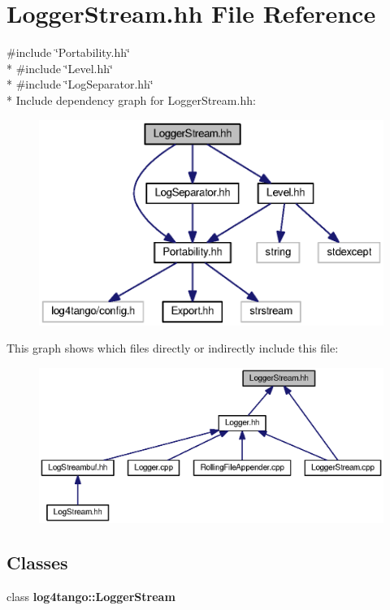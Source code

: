 \section{Logger\-Stream.\-hh File Reference}
\label{LoggerStream_8hh}
{\ttfamily \#include \char`\"{}Portability.\-hh\char`\"{}}\\*
{\ttfamily \#include \char`\"{}Level.\-hh\char`\"{}}\\*
{\ttfamily \#include \char`\"{}Log\-Separator.\-hh\char`\"{}}\\*
Include dependency graph for Logger\-Stream.\-hh\-:
\nopagebreak
\begin{figure}[H]
\begin{center}
\leavevmode
\includegraphics[width=350pt]{da/d21/LoggerStream_8hh__incl}
\end{center}
\end{figure}
This graph shows which files directly or indirectly include this file\-:
\nopagebreak
\begin{figure}[H]
\begin{center}
\leavevmode
\includegraphics[width=350pt]{df/dc0/LoggerStream_8hh__dep__incl}
\end{center}
\end{figure}
\subsection*{Classes}
\begin{DoxyCompactItemize}
\item 
class {\bf log4tango\-::\-Logger\-Stream}
\end{DoxyCompactItemize}
